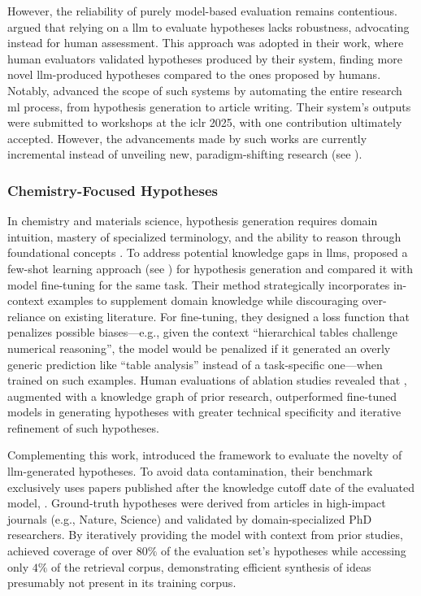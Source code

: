 However, the reliability of purely model-based evaluation remains contentious. 
\textcite{si2025llms} argued that relying on a \gls{llm} to evaluate hypotheses lacks robustness, advocating instead for human assessment. 
This approach was adopted in their work, where human evaluators validated hypotheses produced by their system, finding more novel \gls{llm}-produced hypotheses compared to the ones proposed by humans.
Notably, \textcite{yamada2025ai} advanced the scope of such systems by automating the entire research \gls{ml} process, from hypothesis generation to article writing. 
Their system’s outputs were submitted to workshops at the \gls{iclr} 2025, with one contribution ultimately accepted. However, the advancements made by such works are currently incremental instead of unveiling new, paradigm-shifting research (see ).

\subsubsection{Chemistry-Focused Hypotheses}

In chemistry and materials science, hypothesis generation requires domain intuition, mastery of specialized terminology, and the ability to reason through foundational concepts \autocite{miret2024llms}. 
To address potential knowledge gaps in \glspl{llm}, \textcite{wang2023scimon0} proposed a few-shot learning approach (see ) for hypothesis generation and compared it with model fine-tuning for the same task. 
Their method strategically incorporates in-context examples to supplement domain knowledge while discouraging over-reliance on existing literature. 
For fine-tuning, they designed a loss function that penalizes possible biases---e.g., given the context \enquote{hierarchical tables challenge numerical reasoning}, the model would be penalized if it generated an overly generic prediction like \enquote{table analysis} instead of a task-specific one---when trained on such examples. 
Human evaluations of ablation studies revealed that , augmented with a knowledge graph of prior research, outperformed fine-tuned models in generating hypotheses with greater technical specificity and iterative refinement of such hypotheses.

Complementing this work, \textcite{yang2025moose} introduced the  framework to evaluate the novelty of \gls{llm}-generated hypotheses. 
To avoid data contamination, their benchmark exclusively uses papers published after the knowledge cutoff date of the evaluated model, . 
Ground-truth hypotheses were derived from articles in high-impact journals (e.g., Nature, Science) and validated by domain-specialized PhD researchers.
By iteratively providing the model with context from prior studies,  achieved coverage of over $80\%$ of the evaluation set’s hypotheses while accessing only $4\%$ of the retrieval corpus, demonstrating efficient synthesis of ideas presumably not present in its training corpus.

